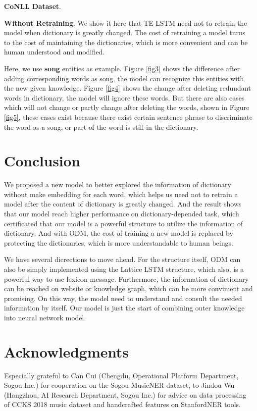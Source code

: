 \documentclass[letterpaper]{article} %
\begin{document}
\textbf{CoNLL Dataset}. 

\textbf{Without Retraining}. We show it here that TE-LSTM need not to retrain the model when dictionary is greatly changed. The cost of retraining a model turns to the cost of maintaining the dictionaries, which is more convenient and can be human understood and modified. 

Here, we use \textbf{song} entities as example. Figure \ref{fig3} shows the difference after adding corresponding words as song, the model can recognize this entities with the new given knowledge. Figure \ref {fig4} shows the change after deleting redundant words in dictionary, the model will ignore these words. But there are also cases which will not change or partly change after deleting the words, shown in Figure \ref{fig5},  these cases exist because there exist certain sentence phrase to discriminate the word as a song,  or part of the word is still in the dictionary.



\section{Conclusion}

We proposed a new model to better explored the information of dictionary without make embedding for each word, which helps us need not to retrain a model after the content of dictionary is greatly changed. And the result shows that our model reach higher performance on dictionary-depended task, which certificated that our model is a powerful structure to utilize the information of dictionary. And with ODM, the cost of training a new model is replaced by protecting the dictionaries, which is more understandable to human beings.

We have several dicrections to move ahead. For the structure itself, ODM can also be simply implemented using the Lattice LSTM structure, which also, is a powerful way to use lexicon message. Furthermore, the information of dictionary can be reached on website or knowledge graph, which can be more convinient and promising. On this way, the model need to understand and consult the needed information by itself. Our model is just the start of combining outer knowledge into neural network model. 

\section{ Acknowledgments }
Especially grateful to Can Cui (Chengdu, Operational Platform Department, Sogou Inc.) for cooperation on the Sogou MusicNER dataset, to Jindou Wu (Hangzhou, AI Research Department, Sogou Inc.) for advice on data processing of CCKS 2018 music dataset and handcrafted features on StanfordNER tools.
\end{document}
